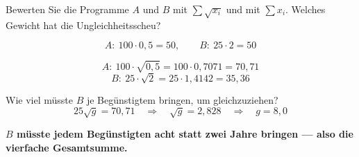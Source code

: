 \begin{aufgabe}
Bewerten Sie die Programme $A$ und $B$ mit $\sum \sqrt{x_i}$ und mit $\sum x_i$. Welches Gewicht hat die Ungleichheitsscheu?

\loesung
{}
\[ A: \ 100\cdot0{,}5 = 50, \qquad B: \ 25\cdot2 = 50 \]

\[ A: \ 100\cdot\sqrt{0{,}5} = 100\cdot0{,}7071 = 70{,}71 \]
\[ B: \ 25\cdot\sqrt{2} = 25\cdot1{,}4142 = 35{,}36 \]

Wie viel müsste $B$ je Begünstigtem bringen, um gleichzuziehen?
\[ 25\sqrt{g} = 70{,}71 \quad\Longrightarrow\quad \sqrt{g} = 2{,}828 \quad\Longrightarrow\quad g = 8{,}0 \]

\begin{center}
\begin{minipage}{0.9\textwidth}
\textbf{$B$ müsste jedem Begünstigten acht statt zwei Jahre bringen --- also die vierfache Gesamtsumme.}
\end{minipage}
\end{center}

\begin{center}
\begin{minipage}{0.88\textwidth}
\end{minipage}
\end{center}
\end{aufgabe}

